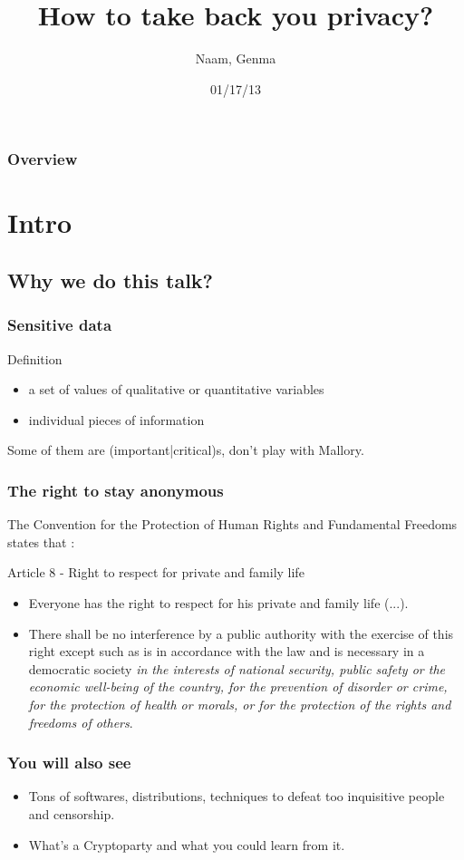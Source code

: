 \documentclass{beamer}
\title[Anonymity and encryption]{How to take back you privacy?}
\author{Naam, Genma}
\institute[@Gconfs]{
EPITA / Gconfs\\
\textit{naam@riseup.net\\ genma@riseup.net}
}
\date{01/17/13}
\begin{document}
\begin{frame}
\titlepage
\end{frame}
\begin{frame}
\frametitle{Overview}
\tableofcontents
\end{frame}
\section{Intro}
\subsection{Why we do this talk?}
\begin{frame}
\frametitle{Sensitive data}
\begin{block}{Definition}
\begin{itemize}
\item a set of values of qualitative or quantitative variables
\item individual pieces of information
\end{itemize}
\end{block}
Some of them are (important|critical)s, don't play with Mallory.
\end{frame}
\begin{frame}
\frametitle{The right to stay anonymous}
The Convention for the Protection of Human Rights and Fundamental Freedoms states
that :
\begin{block}{Article 8 - Right to respect for private and family life}
\begin{itemize}
\item Everyone has the right to respect for his private and family life (...).
\item  There shall be no interference by a public authority with the exercise
of this right except such as is in accordance with the law and is necessary in
a democratic society \emph{in the interests of national security, public safety or
the economic well-being of the country, for the prevention of disorder or crime,
for the protection of health or morals, or for the protection of the rights and
freedoms of others}.
\end{itemize}
\end{block}
\end{frame}
\begin{frame}
\frametitle{You will also see}
\begin{itemize}
\item Tons of softwares, distributions, techniques to defeat too inquisitive
people and censorship.
\item What's a Cryptoparty and what you could learn from it.
\end{itemize}
\end{frame}
\end{document}
